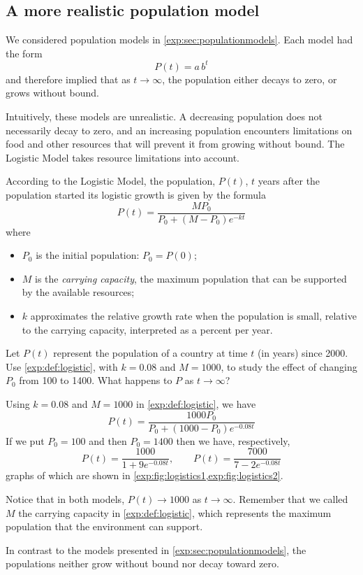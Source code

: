 \subsection*{A more realistic population model}
We considered population models in \cref{exp:sec:populationmodels}. 
Each model had the form 
\[
	P(t) = a\,b^t
\]
and therefore implied that as $t\to\infty$, the population either decays to zero, or grows without bound.
			
Intuitively, these models are unrealistic.  A decreasing population does not necessarily decay to zero, and an 
increasing population encounters limitations on food and other resources that will prevent it from growing 
without bound.  The Logistic Model takes resource limitations into account.
			
\begin{pccdefinition}\label{exp:def:logistic}
	According to the Logistic Model, the population, $P(t)$, $t$ years after the population started its logistic growth is 
	given by the formula
	\[
		P(t) = \frac{MP_0}{P_0+(M-P_0)e^{-kt}}
	\]
	where
	\begin{itemize}
		\item $P_0$ is the initial population:  $P_0=P(0)$;
		\item $M$ is the {\em carrying capacity}, the maximum population that can be supported by the 
		available resources;
		\item $k$ approximates the relative growth rate when the population is small, relative to the carrying capacity, 
		interpreted as a percent per year.       
	\end{itemize}
\end{pccdefinition}
			
\begin{pccexample}\label{exp:ex:logistic}
	Let $P(t)$ represent the population of a country at time $t$ (in years) since 2000.
	Use \cref{exp:def:logistic}, with $k=0.08$ and $M=1000$, to study the effect 
	of changing $P_0$ from 100 to 1400. What happens to $P$ as $t\to\infty$?
	\begin{pccsolution}
		Using $k=0.08$ and $M=1000$ in \cref{exp:def:logistic}, we have
		\[
			P(t) = \frac{1000P_0}{P_0+(1000-P_0)e^{-0.08t}}
		\]
		If we put $P_0=100$ and then $P_0=1400$ then we have, respectively,
		\[
			P(t)=\frac{1000}{1+9e^{-0.08t}}, \qquad P(t)= \frac{7000}{7-2e^{-0.08t}}
		\]
		graphs of which are shown in \cref{exp:fig:logistics1,exp:fig:logistics2}.
																	
		Notice that in both models, $P(t)\to 1000$ as $t\to\infty$. Remember 
		that we called $M$ the carrying capacity in \cref{exp:def:logistic}, 
		which represents the maximum population that the environment can support. 
																	
		In contrast to the models presented in \cref{exp:sec:populationmodels}, the populations 
		neither grow without bound nor decay toward zero. 
	\end{pccsolution}
\end{pccexample}
			
